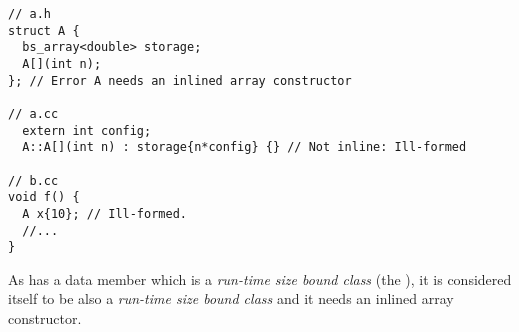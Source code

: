 \begin{lstlisting}
// a.h
struct A {
  bs_array<double> storage;
  A[](int n);
}; // Error A needs an inlined array constructor

// a.cc
  extern int config;
  A::A[](int n) : storage{n*config} {} // Not inline: Ill-formed

// b.cc
void f() {
  A x{10}; // Ill-formed.
  //...
}
\end{lstlisting}

As   has a data member which is a \emph{run-time size bound class}
(the ), it is considered itself to be also a \emph{run-time size
bound class} and it needs an inlined array constructor.

